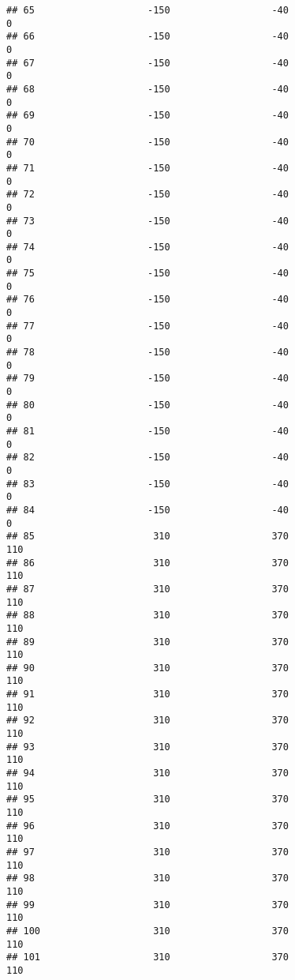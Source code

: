 \documentclass[]{article}
\begin{document}
\begin{verbatim}
## 65                    -150                  -40                    0
## 66                    -150                  -40                    0
## 67                    -150                  -40                    0
## 68                    -150                  -40                    0
## 69                    -150                  -40                    0
## 70                    -150                  -40                    0
## 71                    -150                  -40                    0
## 72                    -150                  -40                    0
## 73                    -150                  -40                    0
## 74                    -150                  -40                    0
## 75                    -150                  -40                    0
## 76                    -150                  -40                    0
## 77                    -150                  -40                    0
## 78                    -150                  -40                    0
## 79                    -150                  -40                    0
## 80                    -150                  -40                    0
## 81                    -150                  -40                    0
## 82                    -150                  -40                    0
## 83                    -150                  -40                    0
## 84                    -150                  -40                    0
## 85                     310                  370                  110
## 86                     310                  370                  110
## 87                     310                  370                  110
## 88                     310                  370                  110
## 89                     310                  370                  110
## 90                     310                  370                  110
## 91                     310                  370                  110
## 92                     310                  370                  110
## 93                     310                  370                  110
## 94                     310                  370                  110
## 95                     310                  370                  110
## 96                     310                  370                  110
## 97                     310                  370                  110
## 98                     310                  370                  110
## 99                     310                  370                  110
## 100                    310                  370                  110
## 101                    310                  370                  110

\end{verbatim}
\end{document}
